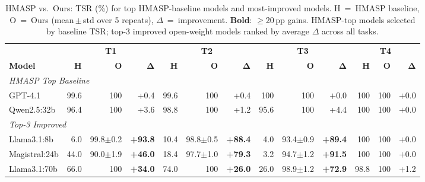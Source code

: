 \begin{table}[!ht]
    \centering
    \caption{HMASP vs.\ Ours: TSR (\%) for top HMASP-baseline models and most-improved models.
    H~=~HMASP baseline, O~=~Ours (mean\,$\pm$\,std over 5 repeats), $\Delta$~=~improvement.
    \textbf{Bold}: $\geq$20\,pp gains. HMASP-top models selected by baseline TSR; top-3 improved
    open-weight models ranked by average $\Delta$ across all tasks.}
    \label{tab:tsr_top_models}
    \renewcommand{\arraystretch}{0.95}
    \setlength{\tabcolsep}{2mm}
    \scriptsize
    \begin{tabular}{l rr@{\;}r rr@{\;}r rr@{\;}r rr@{\;}r}
        \toprule
        & \multicolumn{3}{c}{\textbf{T1}} & \multicolumn{3}{c}{\textbf{T2}} & \multicolumn{3}{c}{\textbf{T3}} & \multicolumn{3}{c}{\textbf{T4}} \\
        \cmidrule(lr){2-4} \cmidrule(lr){5-7} \cmidrule(lr){8-10} \cmidrule(lr){11-13}
        \textbf{Model} & \textbf{H} & \textbf{O} & $\boldsymbol{\Delta}$ & \textbf{H} & \textbf{O} & $\boldsymbol{\Delta}$ & \textbf{H} & \textbf{O} & $\boldsymbol{\Delta}$ & \textbf{H} & \textbf{O} & $\boldsymbol{\Delta}$ \\
        \midrule
        \multicolumn{13}{l}{\textit{HMASP Top Baseline}} \\
        GPT-4.1              & 99.6 & 100 & \scriptsize+0.4 & 99.6 & 100 & \scriptsize+0.4 & 100 & 100 & \scriptsize$+$0.0 & 100 & 100 & \scriptsize$+$0.0 \\
        Qwen2.5:32b          & 96.4 & 100 & \scriptsize+3.6 & 98.8 & 100 & \scriptsize+1.2 & 95.6 & 100 & \scriptsize+4.4 & 100 & 100 & \scriptsize$+$0.0 \\
        \midrule
        \multicolumn{13}{l}{\textit{Top-3 Improved}} \\
        Llama3.1:8b          & 6.0 & 99.8$\pm$0.2 & \textbf{\scriptsize+93.8} & 10.4 & 98.8$\pm$0.5 & \textbf{\scriptsize+88.4} & 4.0 & 93.4$\pm$0.9 & \textbf{\scriptsize+89.4} & 100 & 100 & \scriptsize$+$0.0 \\
        Magistral:24b        & 44.0 & 90.0$\pm$1.9 & \textbf{\scriptsize+46.0} & 18.4 & 97.7$\pm$1.0 & \textbf{\scriptsize+79.3} & 3.2 & 94.7$\pm$1.2 & \textbf{\scriptsize+91.5} & 100 & 100 & \scriptsize$+$0.0 \\
        Llama3.1:70b         & 66.0 & 100 & \textbf{\scriptsize+34.0} & 74.0 & 100 & \textbf{\scriptsize+26.0} & 26.0 & 98.9$\pm$1.2 & \textbf{\scriptsize+72.9} & 98.8 & 100 & \scriptsize+1.2 \\
        \bottomrule
    \end{tabular}
\end{table}


